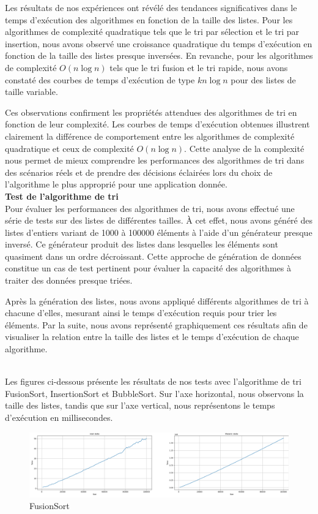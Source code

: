 \documentclass[a4paper,12pt]{article}
\begin{document}
Les résultats de nos expériences ont révélé des tendances significatives dans le temps d'exécution des algorithmes en fonction de la taille des listes. Pour les algorithmes de complexité quadratique tels que le tri par sélection et le tri par insertion, nous avons observé une croissance quadratique du temps d'exécution en fonction de la taille des listes presque inversées. En revanche, pour les algorithmes de complexité $O(n \log n)$ tels que le tri fusion et le tri rapide, nous avons constaté des courbes de temps d'exécution de type $kn \log n$ pour des listes de taille variable.

Ces observations confirment les propriétés attendues des algorithmes de tri en fonction de leur complexité. Les courbes de temps d'exécution obtenues illustrent clairement la différence de comportement entre les algorithmes de complexité quadratique et ceux de complexité $O(n \log n)$. Cette analyse de la complexité nous permet de mieux comprendre les performances des algorithmes de tri dans des scénarios réels et de prendre des décisions éclairées lors du choix de l'algorithme le plus approprié pour une application donnée. \\

\textbf{Test de l'algorithme de tri}\\


Pour évaluer les performances des algorithmes de tri, nous avons effectué une série de tests sur des listes de différentes tailles. À cet effet, nous avons généré des listes d'entiers variant de 1000 à 100000 éléments à l'aide d'un générateur presque inversé. Ce générateur produit des listes dans lesquelles les éléments sont quasiment dans un ordre décroissant. Cette approche de génération de données constitue un cas de test pertinent pour évaluer la capacité des algorithmes à traiter des données presque triées.

Après la génération des listes, nous avons appliqué différents algorithmes de tri à chacune d'elles, mesurant ainsi le temps d'exécution requis pour trier les éléments. Par la suite, nous avons représenté graphiquement ces résultats afin de visualiser la relation entre la taille des listes et le temps d'exécution de chaque algorithme.\\ \\
\newpage

Les figures ci-dessous présente les résultats de nos tests avec l'algorithme de tri FusionSort, InsertionSort et BubbleSort. Sur l'axe horizontal, nous observons la taille des listes, tandis que sur l'axe vertical, nous représentons le temps d'exécution en millisecondes.
\begin{figure}[H]
    \centering
    \includegraphics[width=\textwidth]{FusionSort.png}
    \caption{FusionSort}
    \label{fig:mon_image}
\end{figure}
\end{document}
